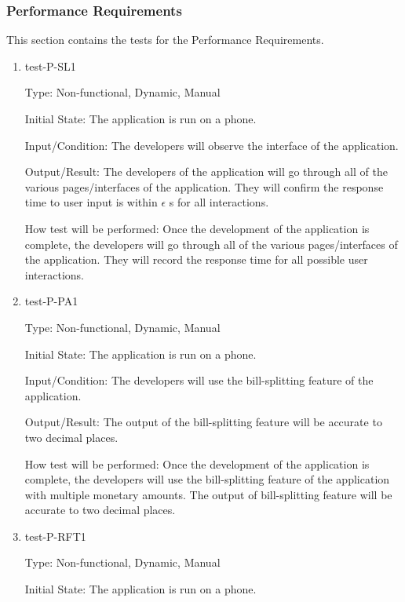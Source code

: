\documentclass[12pt, titlepage]{article}
\begin{document}
\subsubsection{Performance Requirements}

This section contains the tests for the Performance Requirements.
		
\begin{enumerate}

\item{test-P-SL1\\}

Type: Non-functional, Dynamic, Manual 
					
Initial State: The application is run on a phone.
					
Input/Condition: The developers will observe the interface of the application. 
					
Output/Result: The developers of the application will go through all of the various pages/interfaces of the application. They will confirm the response time to user input is within $\epsilon$ s for all interactions.
					
How test will be performed: Once the development of the application is complete, the developers will go through all of the various pages/interfaces of the application. They will record the response time for all possible user interactions.

\item{test-P-PA1\\}

Type: Non-functional, Dynamic, Manual 
					
Initial State: The application is run on a phone.
					
Input/Condition: The developers will use the bill-splitting feature of the application. 
					
Output/Result: The output of the bill-splitting feature will be accurate to two decimal places.
					
How test will be performed: Once the development of the application is complete, the developers will use the bill-splitting feature of the application with multiple monetary amounts. The output of bill-splitting feature will be accurate to two decimal places.

\item{test-P-RFT1\\}

Type: Non-functional, Dynamic, Manual 
					
Initial State: The application is run on a phone.
					

\end{enumerate}
\end{document}
